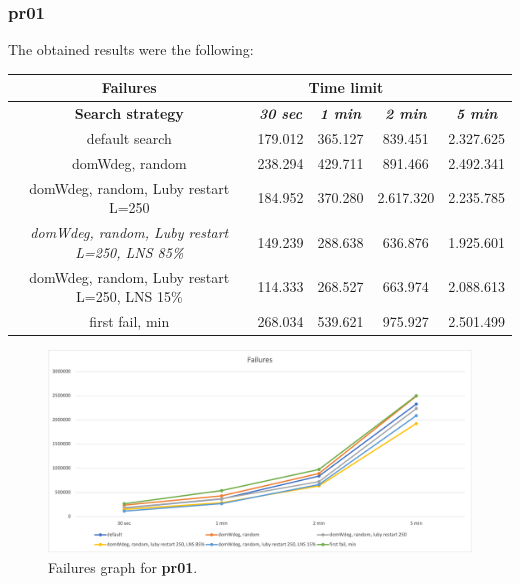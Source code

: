 \subsubsection{pr01}
The obtained results were the following:
{
\renewcommand{\arraystretch}{2}
\begin{longtable}[h]{| c | c | c | c | c |}
    \hline
    \textbf{Failures} & \multicolumn{3}{c}{Time limit} & \\
    \hline
    \textbf{Search strategy} & \textbf{\textit{30 sec}} & \textbf{\textit{1 min}} & \textbf{\textit{2 min}} & \textbf{\textit{5 min}} \\
    \hline
    \endhead
    default search                                         & 179.012 & 365.127 &  839.451 & 2.327.625 \\
    \hline
    domWdeg, random                                        & 238.294 & 429.711 &  891.466 & 2.492.341 \\
    \hline
    domWdeg, random, Luby restart L=250                    & 184.952 & 370.280 & 2.617.320 & 2.235.785 \\
    \hline
    \textit{domWdeg, random, Luby restart L=250, LNS 85\%} & 149.239 & 288.638 &  636.876 & 1.925.601 \\
    \hline
    domWdeg, random, Luby restart L=250, LNS 15\%          & 114.333 & 268.527 &  663.974 & 2.088.613 \\
    \hline
    first fail, min                                        & 268.034 & 539.621 &  975.927 & 2.501.499 \\
    \hline
\end{longtable}
}
\begin{figure}[H]
    \centering
    \includegraphics[width=0.8\columnwidth]{../graphs/pr01-failures.png}
    \caption{Failures graph for \textbf{pr01}.}
\end{figure}

